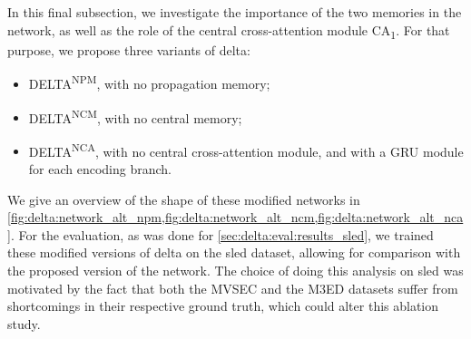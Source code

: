 In this final subsection, we investigate the importance of the two memories in the network, as well as the role of the central cross-attention module CA\textsubscript{1}. For that purpose, we propose three variants of \acrshort{delta}:
\begin{itemize}
  \item DELTA\textsuperscript{NPM}, with no propagation memory;
  \item DELTA\textsuperscript{NCM}, with no central memory;
  \item DELTA\textsuperscript{NCA}, with no central cross-attention module, and with a GRU module for each encoding branch.
\end{itemize}
We give an overview of the shape of these modified networks in \cref{fig:delta:network_alt_npm,fig:delta:network_alt_ncm,fig:delta:network_alt_nca}. For the evaluation, as was done for \cref{sec:delta:eval:results_sled}, we trained these modified versions of \acrshort{delta} on the \acrshort{sled} dataset, allowing for comparison with the proposed version of the network. The choice of doing this analysis on \acrshort{sled} was motivated by the fact that both the MVSEC and the M3ED datasets suffer from shortcomings in their respective ground truth, which could alter this ablation study.

